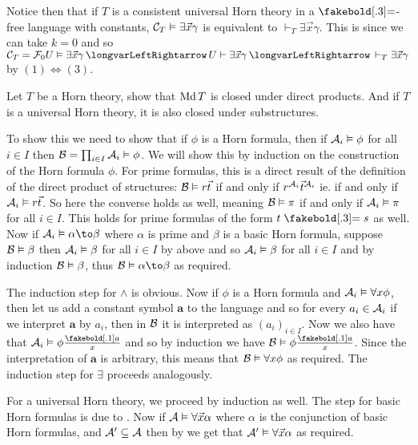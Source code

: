 Notice then that if $T$ is a consistent universal Horn theory in a $\eq$-free language with constants, ${\cal C}_T\vDash\exists\vec x\gamma$ is equivalent to $\vdash_T\exists\vec x\gamma$.
This is since we can take $k=0$ and so ${\cal C}_T={\cal F}_0U\vDash\exists\vec x\gamma\iff U\vdash\exists\vec x\gamma\iff\vdash_T\exists\vec x\gamma$ by $(1)\iff(3)$.

\bexerc

    Let $T$ be a Horn theory, show that $\mathop{\rm Md} T$ is closed under direct products.
    And if $T$ is a universal Horn theory, it is also closed under substructures.

\eexerc

To show this we need to show that if $\phi$ is a Horn formula, then if ${\cal A}_i\vDash\phi$ for all $i\in I$ then ${\cal B}=\prod_{i\in I}{\cal A}_i\vDash\phi$.
We will show this by induction on the construction of the Horn formula $\phi$.
For prime formulas, this is a direct result of the definition of the direct product of structures: ${\cal B}\vDash r\vec t$ if and only if $r^{{\cal A}_i}\vec t^{{\cal A}_i}$ ie. if and only if
${\cal A}_i\vDash r\vec t$.
So here the converse holds as well, meaning ${\cal B}\vDash\pi$ if and only if ${\cal A}_i\vDash\pi$ for all $i\in I$.
This holds for prime formulas of the form $t\eq s$ as well.
Now if ${\cal A}_i\vDash\alpha\to\beta$ where $\alpha$ is prime and $\beta$ is a basic Horn formula, suppose ${\cal B}\vDash\beta$ then ${\cal A}_i\vDash\beta$ for all $i\in I$ by above and so
${\cal A}_i\vDash\beta$ for all $i\in I$ and by induction ${\cal B}\vDash\beta$, thus ${\cal B}\vDash\alpha\to\beta$ as required.

The induction step for $\land$ is obvious.
Now if $\phi$ is a Horn formula and ${\cal A}_i\vDash\forall x\phi$, then let us add a constant symbol $\boldsymbol a$ to the language and so for every $a_i\in{\cal A}_i$ if we interpret $\boldsymbol a$ by
$a_i$, then in ${\cal B}$ it is interpreted as $(a_i)_{i\in I}$.
Now we also have that ${\cal A}_i\vDash\phi\frac{\boldsymbol a}x$ and so by induction we have ${\cal B}\vDash\phi\frac{\boldsymbol a}x$.
Since the interpretation of $\boldsymbol a$ is arbitrary, this means that ${\cal B}\vDash\forall x\phi$ as required.
The induction step for $\exists$ proceeds analogously.

For a universal Horn theory, we proceed by induction as well.
The step for basic Horn formulas is due to .
Now if ${\cal A}\vDash\forall\vec x\alpha$ where $\alpha$ is the conjunction of basic Horn formulas, and ${\cal A}'\subseteq{\cal A}$ then by  we get that
${\cal A}'\vDash\forall\vec x\alpha$ as required.

